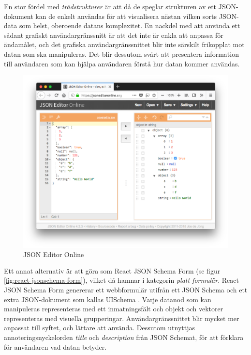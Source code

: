 En stor fördel med \textit{trädstrukturer} är att då de speglar strukturen av ett JSON-dokument kan de enkelt användas för att visualisera nästan vilken sorts JSON-data som helst, oberoende datans komplexitet. En nackdel med att använda ett sådant grafiskt användargränssnitt är att det inte är enkla att anpassa för ändamålet, och det grafiska användargränssnittet blir inte särskilt frikopplat mot datan som ska manipuleras. Det blir dessutom svårt att presentera information till användaren som kan hjälpa användaren förstå hur datan kommer användas.

\begin{figure}
	\includegraphics[width=\textwidth]{./images/screenshot-json-editor.png}
	\vspace{-1.7em}
	\caption{JSON Editor Online \cite{DeJong2018}}
	\label{fig:json-editor}
\end{figure}

Ett annat alternativ är att göra som React JSON Schema Form (se figur \ref{fig:react-jsonschema-form}), vilket då hamnar i kategorin \textit{platt formulär}. React JSON Schema Form genererar ett webbformulär utifrån ett JSON Schema och ett extra JSON-dokument som kallas UISchema \cite{MozillaServices}. Varje datanod som kan manipuleras representeras med ett inmatningsfält och objekt och vektorer representeras med visuella grupperingar. Användargränssnittet blir mycket mer anpassat till syftet, och lättare att använda. Dessutom utnyttjas annoteringsnyckelorden \textit{title} och \textit{description} från JSON Schemat, för att förklara för användaren vad datan betyder.

